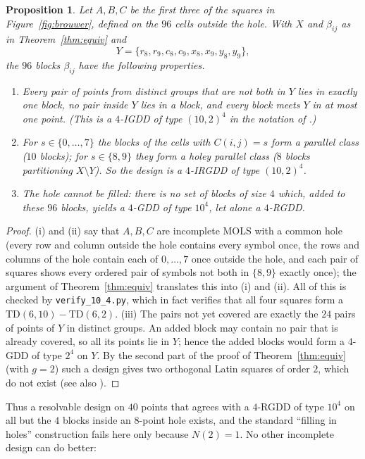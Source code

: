 \documentclass[11pt]{article}
\newtheorem{proposition}[theorem]{Proposition}
\theoremstyle{remark}
\newcommand{\TD}{\mathrm{TD}}
\begin{document}
\begin{proposition}\label{prop:irgdd}
Let $A,B,C$ be the first three of the squares in Figure~\ref{fig:brouwer}, defined on the
$96$ cells outside the hole.  With $X$ and $\beta_{ij}$ as in Theorem~\ref{thm:equiv} and
\[
Y=\{r_8,r_9,c_8,c_9,x_8,x_9,y_8,y_9\},
\]
the $96$ blocks $\beta_{ij}$ have the following properties.
\begin{enumerate}
\item[(i)] Every pair of points from distinct groups that are not both in $Y$ lies in
  exactly one block, no pair inside $Y$ lies in a block, and every block meets $Y$ in at
  most one point.  (This is a $4$-IGDD of type $(10,2)^{4}$ in the notation of
  \cite{WG14}.)
\item[(ii)] For $s\in\{0,\dots,7\}$ the blocks of the cells with $C(i,j)=s$ form a parallel
  class ($10$ blocks); for $s\in\{8,9\}$ they form a holey parallel class ($8$ blocks
  partitioning $X\setminus Y$).  So the design is a $4$-IRGDD of type $(10,2)^{4}$.
\item[(iii)] The hole cannot be filled: there is no set of blocks of size $4$ which,
  added to these $96$ blocks, yields a $4$-GDD of type $10^{4}$, let alone a $4$-RGDD.
\end{enumerate}
\end{proposition}

\begin{proof}
(i) and (ii) say that $A,B,C$ are incomplete MOLS with a common hole (every row and
column outside the hole contains every symbol once, the rows and columns of the hole
contain each of $0,\dots,7$ once outside the hole, and each pair of squares shows every
ordered pair of symbols not both in $\{8,9\}$ exactly once); the argument of
Theorem~\ref{thm:equiv} translates this into (i) and (ii).  All of this is checked by
\texttt{verify\_10\_4.py}, which in fact verifies that all four squares form a
$\TD(6,10)-\TD(6,2)$.
(iii) The pairs not yet covered are exactly the $24$ pairs of points of $Y$ in distinct
groups.  An added block may contain no pair that is already covered, so all its points
lie in $Y$; hence the added blocks would form a $4$-GDD of type $2^{4}$ on $Y$.  By the
second part of the proof of Theorem~\ref{thm:equiv} (with $g=2$) such a design gives two
orthogonal Latin squares of order $2$, which do not exist (see also \cite{BSH77}).
\end{proof}

Thus a resolvable design on $40$ points that agrees with a $4$-RGDD of type $10^{4}$ on
all but the $4$ blocks inside an $8$-point hole exists, and the standard ``filling in
holes'' construction fails here only because $N(2)=1$.  No other incomplete design can
do better:
\end{document}
